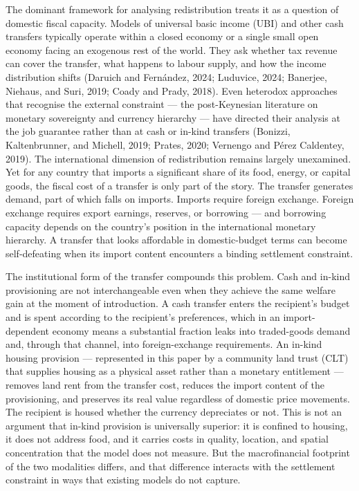 \documentclass[preprint,review,12pt]{elsarticle}
\begin{document}
The dominant framework for analysing redistribution treats it as a
question of domestic fiscal capacity. Models of universal basic income
(UBI) and other cash transfers typically operate within a closed economy
or a single small open economy facing an exogenous rest of the world.
They ask whether tax revenue can cover the transfer, what happens to
labour supply, and how the income distribution shifts (Daruich and
Fernández, 2024; Luduvice, 2024; Banerjee, Niehaus, and Suri, 2019;
Coady and Prady, 2018). Even heterodox approaches that recognise the
external constraint --- the post-Keynesian literature on monetary
sovereignty and currency hierarchy --- have directed their analysis at
the job guarantee rather than at cash or in-kind transfers (Bonizzi,
Kaltenbrunner, and Michell, 2019; Prates, 2020; Vernengo and Pérez
Caldentey, 2019). The international dimension of redistribution remains
largely unexamined. Yet for any country that imports a significant share
of its food, energy, or capital goods, the fiscal cost of a transfer is
only part of the story. The transfer generates demand, part of which
falls on imports. Imports require foreign exchange. Foreign exchange
requires export earnings, reserves, or borrowing --- and borrowing
capacity depends on the country's position in the international monetary
hierarchy. A transfer that looks affordable in domestic-budget terms can
become self-defeating when its import content encounters a binding
settlement constraint.

The institutional form of the transfer compounds this problem. Cash and
in-kind provisioning are not interchangeable even when they achieve the
same welfare gain at the moment of introduction. A cash transfer enters
the recipient's budget and is spent according to the recipient's
preferences, which in an import-dependent economy means a substantial
fraction leaks into traded-goods demand and, through that channel, into
foreign-exchange requirements. An in-kind housing provision ---
represented in this paper by a community land trust (CLT) that supplies
housing as a physical asset rather than a monetary entitlement ---
removes land rent from the transfer cost, reduces the import content of
the provisioning, and preserves its real value regardless of domestic
price movements. The recipient is housed whether the currency
depreciates or not. This is not an argument that in-kind provision is
universally superior: it is confined to housing, it does not address
food, and it carries costs in quality, location, and spatial
concentration that the model does not measure. But the macrofinancial
footprint of the two modalities differs, and that difference interacts
with the settlement constraint in ways that existing models do not
capture.
\end{document}
